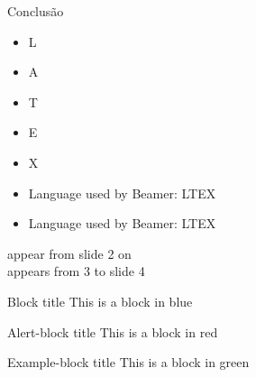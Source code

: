 \documentclass[notes,blue,mathserif]{beamer}
\begin{document}
\begin{frame}{Conclus\~{a}o}
\begin{itemize}[<+->]
\item L
\item A
\item T
\item E
\item X
\end{itemize}
\end{frame}

\begin{frame}

\begin{itemize}
\item Language used by Beamer: LTEX
\item Language used by Beamer: LTEX
\end{itemize}

\end{frame}

\begin{frame}

{appear from slide 2 on\\}
{appears from 3 to slide 4\\}

\end{frame}

\begin{frame}
\begin{block}{Block title}
This is a block in blue
\end{block}

\begin{alertblock}{Alert-block title}
This is a block in red
\end{alertblock}

\begin{exampleblock}{Example-block title}
This is a block in green
\end{exampleblock}
\end{frame}
\end{document}
